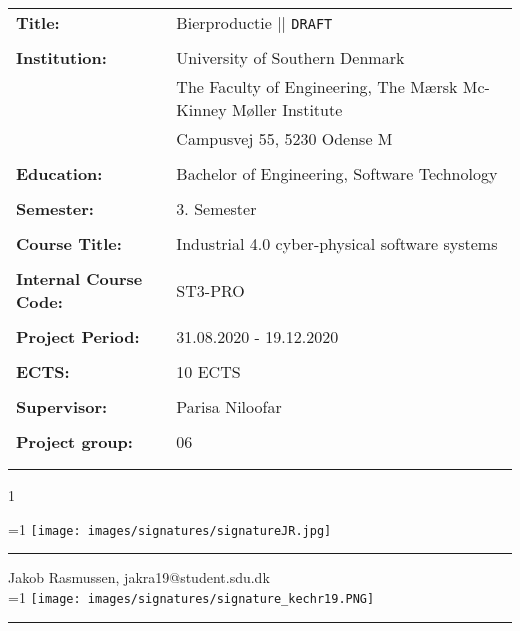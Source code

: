 \begin{tabular}{@{}l l} 
\textbf{Title:} & Bierproductie || \texttt{DRAFT}\\
& \\
\textbf{Institution:} & University of Southern Denmark \\
& The Faculty of Engineering, The Mærsk Mc-Kinney Møller Institute \\
& Campusvej 55, 5230 Odense M \\
& \\
\textbf{Education:} & Bachelor of Engineering, Software Technology\\
& \\
\textbf{Semester:} & 3. Semester \\
& \\
\textbf{Course Title:} & Industrial 4.0 cyber-physical software systems \\
& \\
\textbf{Internal Course Code:} & ST3-PRO \\
& \\
\textbf{Project Period:} &  31.08.2020 - 19.12.2020\\
& \\
\textbf{ECTS:} & 10 ECTS\\
& \\
\textbf{Supervisor:} & Parisa Niloofar\\
& \\
\textbf{Project group:} & 06\\
& \\

\\
\end{tabular}

\setcounter{PROD} {1}



\ifnum \value{PROD}=1
    \texttt{[image: images/signatures/signatureJR.jpg]}
    \vspace{-9.5mm}
\fi
\par\rule{\textwidth}{0.4pt}

Jakob Rasmussen, jakra19@student.sdu.dk\\


\ifnum \value{PROD}=1
    \texttt{[image: images/signatures/signature\_kechr19.PNG]}
    \vspace{-5mm}
\fi
\par\rule{\textwidth}{0.4pt}

